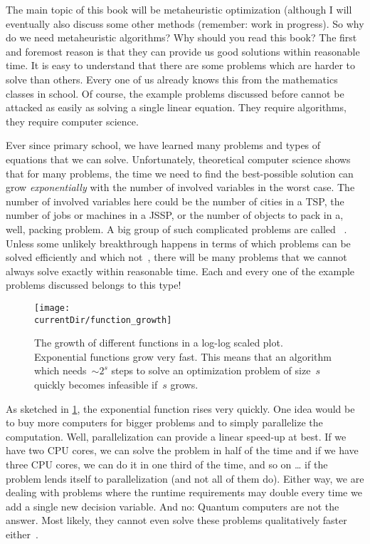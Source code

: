 %
%
The main topic of this book will be metaheuristic optimization (although I will eventually also discuss some other methods (remember: work in progress).
So why do we need metaheuristic algorithms?
Why should you read this book?%
%
%
\label{sec:approximationOfTheOptimum}%
%
The first and foremost reason is that they can provide us good solutions within reasonable time.
It is easy to understand that there are some problems which are harder to solve than others.
Every one of us already knows this from the mathematics classes in school.
Of course, the example problems discussed before cannot be attacked as easily as solving a single linear equation.
They require algorithms, they require computer science.

Ever since primary school, we have learned many problems and types of equations that we can solve.
Unfortunately, theoretical computer science shows that for many problems, the time we need to find the best-possible solution can grow \emph{exponentially} with the number of involved variables in the worst case.
The number of involved variables here could be the number of cities in a \gls{TSP}, the number of jobs or machines in a \gls{JSSP}, or the number of objects to pack in a, well, packing problem.
A big group of such complicated problems are called \NPhard~\cite{LLRKS1993SASAAC,CPW1998AROMSCAAA}.
Unless some unlikely breakthrough happens in terms of which problems can be solved efficiently and which not~\cite{C1971TCOTPP,K1972RACP}, there will be many problems that we cannot always solve exactly within reasonable time.
Each and every one of the example problems discussed belongs to this type!

\begin{figure}%
\centering%
\texttt{[image: \\currentDir/function\_growth]}%
\caption{The growth of different functions in a log-log scaled plot. Exponential functions grow very fast. This means that an algorithm which needs~$\sim 2^s$ steps to solve an optimization problem of size~$s$ quickly becomes infeasible if~$s$ grows.}%
\label{fig:function_growth}%
\end{figure}

As sketched in \cref{fig:function_growth}, the exponential function rises very quickly.
One idea would be to buy more computers for bigger problems and to simply parallelize the computation.
Well, parallelization can provide a linear speed-up at best.
If we have two CPU cores, we can solve the problem in half of the time and if we have three CPU cores, we can do it in one third of the time, and so on {\dots} if the problem lends itself to parallelization (and not all of them do).
Either way, we are dealing with problems where the runtime requirements may double every time we add a single new decision variable.
And no: Quantum computers are not the answer.
Most likely, they cannot even solve these problems qualitatively faster either~\cite{A2008TLOQC}.

